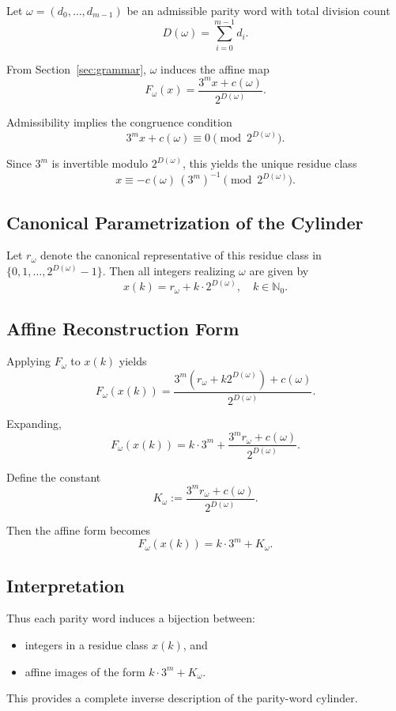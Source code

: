 \documentclass[12pt, oneside]{article}   	%
\numberwithin{equation}{section}          %
\theoremstyle{definition}
\begin{document}
Let $\omega = (d_0,\dots,d_{m-1})$ be an admissible parity word with total division count
\[
D(\omega) = \sum_{i=0}^{m-1} d_i.
\]

From Section~\ref{sec:grammar}, $\omega$ induces the affine map
\[
F_\omega(x) = \frac{3^m x + c(\omega)}{2^{D(\omega)}}.
\]

Admissibility implies the congruence condition
\[
3^m x + c(\omega) \equiv 0 \pmod{2^{D(\omega)}}.
\]

Since $3^m$ is invertible modulo $2^{D(\omega)}$, this yields the unique residue class
\[
x \equiv -c(\omega)\,(3^m)^{-1} \pmod{2^{D(\omega)}}.
\]

\subsection{Canonical Parametrization of the Cylinder}

Let $r_\omega$ denote the canonical representative of this residue class in
$\{0,1,\dots,2^{D(\omega)}-1\}$. Then all integers realizing $\omega$ are given by
\[
x(k) = r_\omega + k\cdot 2^{D(\omega)}, \quad k \in \mathbb{N}_0.
\]

\subsection{Affine Reconstruction Form}

Applying $F_\omega$ to $x(k)$ yields
\[
F_\omega(x(k))
= \frac{3^m (r_\omega + k2^{D(\omega)}) + c(\omega)}{2^{D(\omega)}}.
\]

Expanding,
\[
F_\omega(x(k))
= k\cdot 3^m + \frac{3^m r_\omega + c(\omega)}{2^{D(\omega)}}.
\]

Define the constant
\[
K_\omega := \frac{3^m r_\omega + c(\omega)}{2^{D(\omega)}}.
\]

Then the affine form becomes
\[
F_\omega(x(k)) = k\cdot 3^m + K_\omega.
\]

\subsection{Interpretation}

Thus each parity word induces a bijection between:
\begin{itemize}
\item integers in a residue class $x(k)$, and
\item affine images of the form $k\cdot 3^m + K_\omega$.
\end{itemize}

This provides a complete inverse description of the parity-word cylinder.
\end{document}
